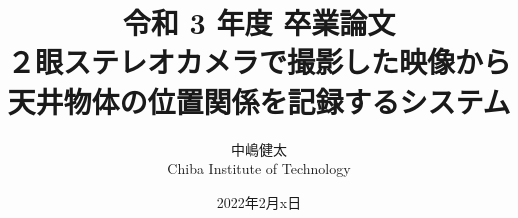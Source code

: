 \documentclass[a4paper,11pt]{jsbook}
\begin{document}
\title{令和 3 年度 卒業論文\\
２眼ステレオカメラで撮影した映像から\\
天井物体の位置関係を記録するシステム}

\author{中嶋健太 \\
Chiba Institute of Technology}

\date{2022年2月x日}

\maketitle





\tableofcontents



\cleardoublepage
{}


%
%
%

\appendix





\newpage
\printindex
\end{document}

